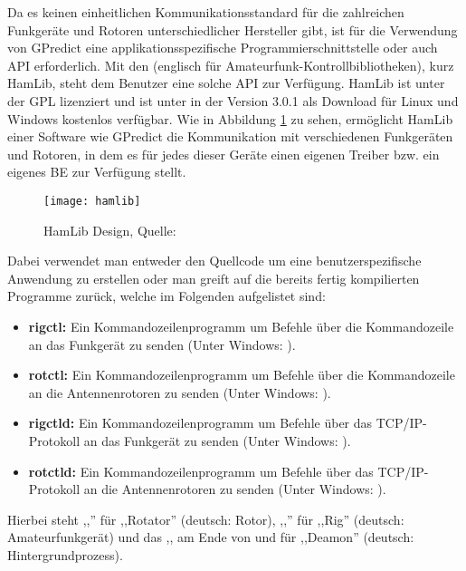 Da es keinen einheitlichen Kommunikationsstandard für die zahlreichen Funkgeräte und Rotoren unterschiedlicher Hersteller gibt, ist für die Verwendung von GPredict eine applikationsspezifische Programmierschnittstelle oder auch \ac{API} erforderlich. Mit den  (englisch für Amateurfunk-Kontrollbibliotheken), kurz HamLib, steht dem Benutzer eine solche \ac{API} zur Verfügung. HamLib ist unter der \ac{GPL} lizenziert und ist unter \cite{hamlibdownload} in der Version 3.0.1 als Download für Linux und Windows kostenlos verfügbar. Wie in Abbildung \ref{fig:hamlib} zu sehen, ermöglicht HamLib einer Software wie GPredict die Kommunikation mit verschiedenen Funkgeräten und Rotoren, in dem es für jedes dieser Geräte einen eigenen Treiber bzw. ein eigenes \ac{BE} zur Verfügung stellt.

\begin{figure}[h]
	\centering
	\texttt{[image: hamlib]}
	\caption{HamLib Design, Quelle: \cite{hamlibmanual}}
	\label{fig:hamlib} 
\end{figure}

Dabei verwendet man entweder den Quellcode um eine benutzerspezifische Anwendung zu erstellen oder man greift auf die bereits fertig kompilierten Programme zurück, welche im Folgenden aufgelistet sind:

\begin{itemize}
	\parskip0pt
	\item \textbf{rigctl:} Ein Kommandozeilenprogramm um Befehle über die Kommandozeile an das Funkgerät zu senden (Unter Windows: ).
	\item \textbf{rotctl:} Ein Kommandozeilenprogramm um Befehle über die Kommandozeile an die Antennenrotoren zu senden (Unter Windows: ).
	\item \textbf{rigctld:} Ein Kommandozeilenprogramm um Befehle über das TCP/IP-Protokoll an das Funkgerät zu senden (Unter Windows: ).
	\item \textbf{rotctld:}  Ein Kommandozeilenprogramm um Befehle über das TCP/IP-Protokoll an die Antennenrotoren zu senden (Unter Windows: ).
\end{itemize}

Hierbei steht ,,'' für ,,Rotator'' (deutsch: Rotor), ,,'' für  ,,Rig'' (deutsch: Amateurfunkgerät) und das ,, am Ende von  und  für ,,Deamon'' (deutsch: Hintergrundprozess).

